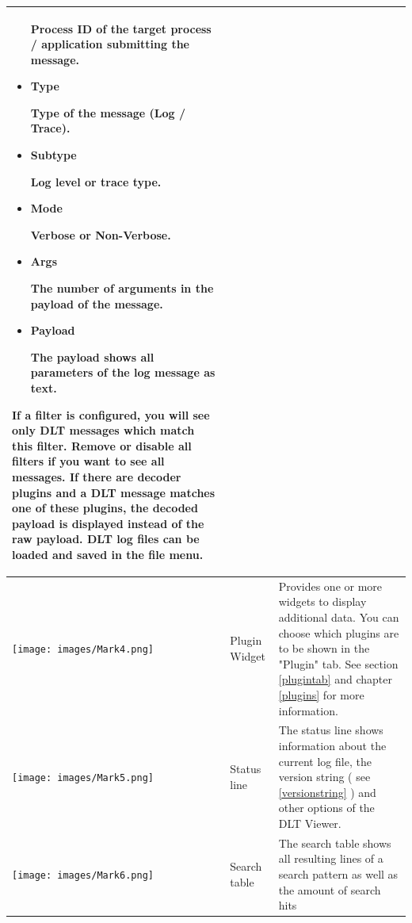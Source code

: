 \documentclass[a4paper,11pt]{article}
\begin{document}
\begin{longtable}{| l | m{3cm}  | m{11cm} |}
\begin{itemize}
    Process ID of the target process / application submitting the message.
   \item \begin{bf}Type\end{bf}
    Type of the message (Log / Trace).
   \item \begin{bf}Subtype\end{bf}
    Log level or trace type.
   \item \begin{bf}Mode\end{bf}
    Verbose or Non-Verbose.
   \item \begin{bf}Args\end{bf}
    The number of arguments in the payload of the message.
   \item \begin{bf}Payload\end{bf}
    The payload shows all parameters of the log message as text.
  \end{itemize}
If a filter is configured, you will see only DLT messages which match
this filter. Remove or disable all filters if you want to see all messages.
If there are decoder plugins and a DLT message matches one of these plugins, the decoded
payload is displayed instead of the raw payload.
DLT log files can be loaded and saved in the file menu.
 \\
   \hline
   \texttt{[image: images/Mark4.png]}
   & Plugin Widget
   & Provides one or more widgets to display additional data. You can choose which plugins are to be shown in the "Plugin" tab.
   See section \autoref{plugintab} and chapter \autoref{plugins} for more information.   \\
   \hline
   \texttt{[image: images/Mark5.png]}
   & Status line
   & \label{footer}The status line shows information about the current log file,
     the version string ( see \autoref{versionstring} ) and other options of the DLT Viewer. \\
   \hline
   \texttt{[image: images/Mark6.png]}
    & Search table
    & \label{searchtable}The search table shows all resulting lines of a search pattern as well as the amount of search hits \\
   \hline

\end{longtable}


\pagebreak

\end{document}
